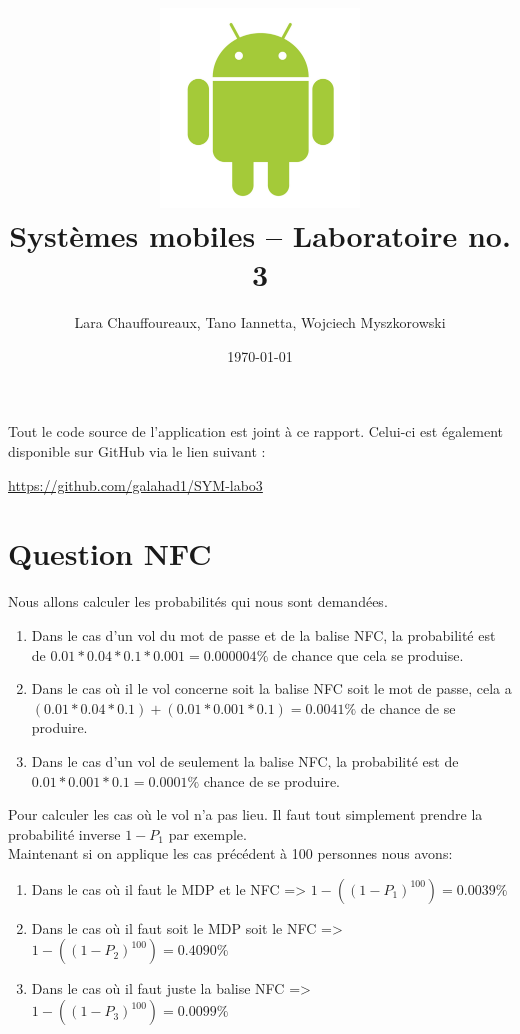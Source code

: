\documentclass[12pt]{article}
\title{\includegraphics[width=200px]{title}\\
  \vspace{40 mm}
  \huge{Systèmes mobiles -- Laboratoire no. 3}
\vspace{20 mm}
}
\author{Lara Chauffoureaux, Tano Iannetta, Wojciech Myszkorowski}
\date{\today}
\begin{document}
\maketitle
\thispagestyle{empty}
\clearpage

Tout le code source de l'application est joint à ce rapport. Celui-ci est également disponible sur GitHub via le lien suivant : 

\url{https://github.com/galahad1/SYM-labo3}

\section*{Question NFC}

Nous allons calculer les probabilités qui nous sont demandées.

\begin{enumerate}
\item Dans le cas d'un vol du mot de passe et de la balise NFC, la probabilité est de $0.01 * 0.04 * 0.1 *0.001 = 0.000004\%$ de chance que cela se produise.
\medskip

\item Dans le cas où il le vol concerne soit la balise NFC soit le mot de passe, cela a $(0.01 * 0.04 * 0.1) + (0.01 * 0.001 * 0.1) = 0.0041\%$ de chance de se produire.
\medskip

\item Dans le cas d'un vol de seulement la balise NFC, la probabilité est de $0.01 * 0.001 * 0.1  = 0.0001\%$ chance de se produire.
\end{enumerate}


Pour calculer les cas où le vol n'a pas lieu. Il faut tout simplement prendre la probabilité inverse $1-P_1$ par exemple. \\

Maintenant si on applique les cas précédent à 100 personnes nous avons: 

\begin{enumerate}[resume]
\item Dans le cas où il faut le MDP et le NFC => $1-((1-P_1)^{100}) = 0.0039\%$
\medskip

\item Dans le cas où il faut soit le MDP soit le NFC => $1-((1-P_2)^{100}) = 0.4090\%$
\medskip

\item Dans le cas où il faut juste la balise NFC => $1-((1-P_3)^{100}) = 0.0099\%$
\end{enumerate}
\end{document}
